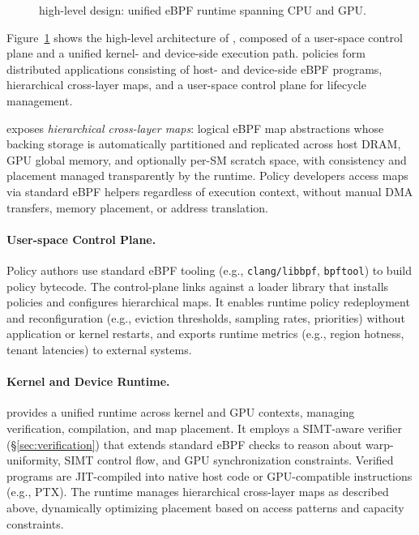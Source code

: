 \begin{figure}
\centering
{}
\vspace{-.5ex}
\caption{\sys high-level design: unified eBPF runtime spanning CPU and GPU.}
\label{fig:system-design}
\end{figure}

Figure~\ref{fig:system-design} shows the high-level architecture of \sys, composed of a user-space control plane and a unified kernel- and device-side execution path. \sys policies form distributed applications consisting of host- and device-side eBPF programs, hierarchical cross-layer maps, and a user-space control plane for lifecycle management.

\sys exposes \emph{hierarchical cross-layer maps}: logical eBPF map abstractions whose backing storage is automatically partitioned and replicated across host DRAM, GPU global memory, and optionally per-SM scratch space, with consistency and placement managed transparently by the runtime. Policy developers access maps via standard eBPF helpers regardless of execution context, without manual DMA transfers, memory placement, or address translation.

\paragraph{User-space Control Plane.}
Policy authors use standard eBPF tooling (e.g., \texttt{clang/libbpf}, \texttt{bpftool}) to build policy bytecode. The control-plane links against a loader library that installs policies and configures hierarchical maps. It enables runtime policy redeployment and reconfiguration (e.g., eviction thresholds, sampling rates, priorities) without application or kernel restarts, and exports runtime metrics (e.g., region hotness, tenant latencies) to external systems.

\paragraph{Kernel and Device Runtime.}
\sys provides a unified runtime across kernel and GPU contexts, managing verification, compilation, and map placement. It employs a SIMT-aware verifier (\S\ref{sec:verification}) that extends standard eBPF checks to reason about warp-uniformity, SIMT control flow, and GPU synchronization constraints. Verified programs are JIT-compiled into native host code or GPU-compatible instructions (e.g., PTX). The runtime manages hierarchical cross-layer maps as described above, dynamically optimizing placement based on access patterns and capacity constraints.

